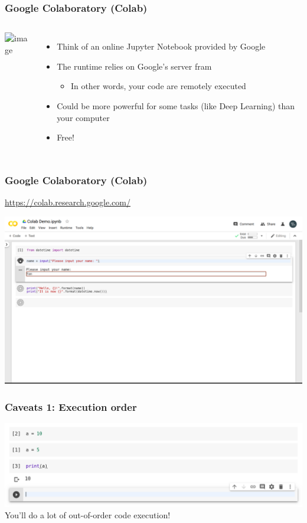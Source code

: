 \documentclass[aspectratio=169]{beamer}
\begin{document}
\begin{frame}
    \frametitle{Google Colaboratory (Colab)}
    \begin{columns}
            \begin{center}
                \includegraphics<2->[width=\columnwidth]{images/colab-logo.png}
            \end{center}
        \begin{itemize}[<+(2)->]
            \item Think of an online Jupyter Notebook provided by Google
            \item The runtime relies on Google's server fram
            \begin{itemize}
                \item In other words, your code are remotely executed
            \end{itemize}
            \item Could be more powerful for some tasks (like Deep Learning) than your computer
            \item Free!
        \end{itemize}
    \end{columns}
\end{frame}

\begin{frame}
    \frametitle{Google Colaboratory (Colab)}
    \centering
    \huge \url{https://colab.research.google.com/}
\end{frame}

\begin{frame}
    \includegraphics[width=\textwidth]{images/colab-demo.png}
\end{frame}

\begin{frame}
    \frametitle{Caveats 1: Execution order}
    \includegraphics[width=\textwidth]{images/colab-ooo-execution.png}
    \pause
    You'll do a lot of out-of-order code execution!
\end{frame}
\end{document}
